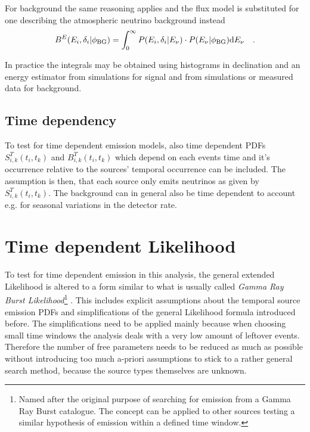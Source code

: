 For background the same reasoning applies and the flux model is substituted for one describing the atmospheric neutrino background instead
\begin{equation}
  B^E(E_i, \delta_i|\phi_\mathrm{BG}) =
    \int_0^\infty P(E_i,\delta_i|E_\nu)\cdot P(E_\nu|\phi_\mathrm{BG}) \mathrm{d}E_\nu
    \quad\text{.}
\end{equation}

In practice the integrals may be obtained using histograms in declination and an energy estimator from simulations for signal and from simulations or measured data for background.

\subsection{Time dependency}
To test for time dependent emission models, also time dependent PDFs $S_{i,k}^T(t_i, t_k)$ and $B_{i,k}^T(t_i, t_k)$ which depend on each events time and it's occurrence relative to the sources' temporal occurrence can be included.
The assumption is then, that each source only emits neutrinos as given by $S_{i,k}^T(t_i, t_k)$.
The background can in general also be time dependent to account e.g. for seasonal variations in the detector rate.


\section{Time dependent Likelihood}
To test for time dependent emission in this analysis, the general extended Likelihood is altered to a form similar to what is usually called \emph{Gamma Ray Burst Likelihood}\footnote{Named after the original purpose of searching for emission from a Gamma Ray Burst catalogue. The concept can be applied to other sources testing a similar hypothesis of emission within a defined time window.} .
This includes explicit assumptions about the temporal source emission PDFs and simplifications of the general Likelihood formula introduced before.
The simplifications need to be applied mainly because when choosing small time windows the analysis deals with a very low amount of leftover events.
Therefore the number of free parameters needs to be reduced as much as possible without introducing too much a-priori assumptions to stick to a rather general search method, because the source types themselves are unknown.

